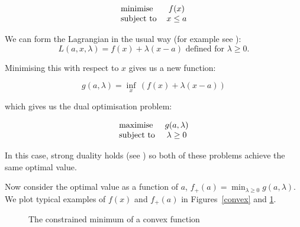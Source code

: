 \documentclass[10pt]{article}
\begin{document}
\[
\begin{tabular}{l c}
minimise & $f(x)$ \\
subject to & $x\le a$ \\
\end{tabular}
\]

We can form the Lagrangian in the usual way (for example see \cite{boyd}):
\[
L(a,x,\lambda) = f(x)+\lambda(x-a) \mbox{ defined for $\lambda\ge 0$}.
\]

Minimising this with respect to $x$ gives us a new function:

\[
g(a,\lambda) = \inf_x\, (f(x)+\lambda(x-a))
\]

which gives us the dual optimisation problem:

\[
\begin{tabular}{l c}
maximise & $g(a,\lambda)$ \\
subject to & $\lambda\ge 0$ \\
\end{tabular}
\]

In this case, strong duality holds (see \cite{strong}) so both of these problems achieve the same optimal value.

Now consider the optimal value as a function of $a$, $f_+(a)=\min_{\lambda\ge0}g(a,\lambda)$.
We plot typical examples of $f(x)$ and $f_+(a)$ in Figures~\ref{convex} and \ref{min}.

\begin{figure}
\centering
{}
\caption{The constrained minimum of a convex function}
\label{min}
\end{figure}
\end{document}
